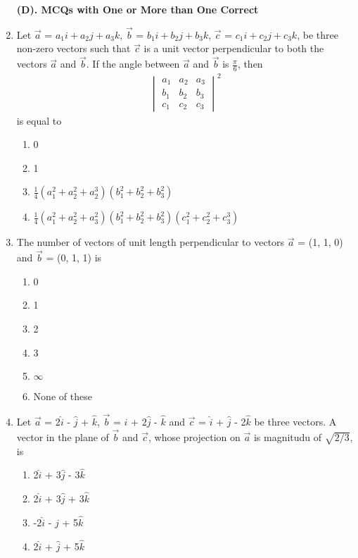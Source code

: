 \begin{enumerate}[label=\arabic*.,ref=\thesubsection.\theenumi]
\textbf{(D). MCQs with One or More than One Correct}
\item Let $\overrightarrow{a}$ = $a_{1}i + a_{2}j + a_{3}k$, $\overrightarrow{b}$ = $b_{1}i + b_{2}j + b_{3}k$, $\overrightarrow{c}$ = $c_{1}i + c_{2}j + c_{3}k$, be three non-zero vectors such that $\overrightarrow{c}$ is a unit vector perpendicular to both the vectors $\overrightarrow{a}$ and $\overrightarrow{b}$. If the angle between $\overrightarrow{a}$ and $\overrightarrow{b}$ is $\frac{\pi}{6}$, then 
\begin{align*}
\begin{vmatrix} a_1 & a_2 & a_3 \\ b_1 & b_2 & b_3 \\ c_1 & c_2 & c_3  \end{vmatrix}^{2}
\end{align*}
is equal to
\begin{enumerate}
\item 0
\item 1
\item $\frac{1}{4}(a_1^{2} + a_2^{2} + a_2^{3})(b_1^{2} + b_2^{2} + b_3^{2})$
\item $\frac{1}{4}(a_1^{2} + a_2^{2} + a_3^{2})(b_1^{2} + b_2^{2} + b_3^{2})(c_1^{2} + c_2^{2} + c_3^{3})$
\end{enumerate}

\item The number of vectors of unit length perpendicular to vectors $\overrightarrow{a}$ = (1, 1, 0) and $\overrightarrow{b}$ = (0, 1, 1) is
\begin{enumerate}
\item 0
\item 1
\item 2
\item 3
\item $\infty$
\item None of these
\end{enumerate}

\item Let $\overrightarrow{a}$ = 2$\hat{i}$ - $\hat{j}$ + $\hat{k}$, $\overrightarrow{b}$ = $\hat{i}$ + $2\hat{j}$ - $\hat{k}$ and $\overrightarrow{c}$ = $\hat{i}$ + $\hat{j}$ - 2$\hat{k}$ be three vectors. A vector in the plane of $\overrightarrow{b}$ and $\overrightarrow{c}$, whose projection on $\overrightarrow{a}$ is magnitudu of $\sqrt{2/3}$, is
\begin{enumerate}
\item 2$\hat{i}$ + 3$\hat{j}$ - 3$\hat{k}$
\item 2$\hat{i}$ + 3$\hat{j}$ + 3$\hat{k}$
\item -2$\hat{i}$ - $\hat{j}$ + 5$\hat{k}$
\item 2$\hat{i}$ + $\hat{j}$ + 5$\hat{k}$
\end{enumerate}


\end{enumerate}
